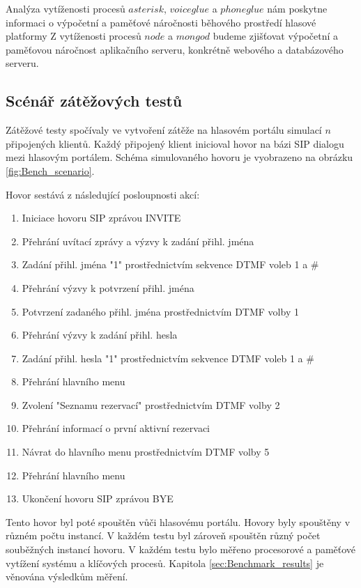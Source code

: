 \documentclass[ing,male,java,dept460]{diploma}						%
\begin{document}
Analýza vytíženosti procesů $asterisk$, $voiceglue$ a $phoneglue$ nám poskytne informaci o výpočetní a paměťové náročnosti běhového prostředí hlasové platformy Z vytíženosti procesů $node$ a $mongod$ budeme zjišťovat výpočetní a paměťovou náročnost aplikačního serveru, konkrétně webového a databázového serveru.

\subsection{Scénář zátěžových testů}
Zátěžové testy spočívaly ve vytvoření zátěže na hlasovém portálu simulací $n$ připojených klientů. Každý připojený klient inicioval hovor na bázi SIP dialogu mezi hlasovým portálem. Schéma simulovaného hovoru je vyobrazeno na obrázku \ref{fig:Bench_scenario}.

Hovor sestává z následující posloupnosti akcí:

\begin{enumerate}
\item Iniciace hovoru SIP zprávou INVITE
\item Přehrání uvítací zprávy a výzvy k zadání přihl. jména
\item Zadání přihl. jména "1" prostřednictvím sekvence DTMF voleb 1 a \#
\item Přehrání výzvy k potvrzení přihl. jména
\item Potvrzení zadaného přihl. jména prostřednictvím DTMF volby 1
\item Přehrání výzvy k zadání přihl. hesla
\item Zadání přihl. hesla "1" prostřednictvím sekvence DTMF voleb 1 a \#
\item Přehrání hlavního menu
\item Zvolení "Seznamu rezervací" prostřednictvím DTMF volby 2
\item Přehrání informací o první aktivní rezervaci
\item Návrat do hlavního menu prostřednictvím DTMF volby 5
\item Přehrání hlavního menu
\item Ukončení hovoru SIP zprávou BYE
\end{enumerate}

Tento hovor byl poté spouštěn vůči hlasovému portálu. Hovory byly spouštěny v různém počtu instancí. V každém testu byl zároveň spouštěn různý počet souběžných instancí hovoru. V každém testu bylo měřeno procesorové a paměťové vytížení systému a klíčových procesů. Kapitola \ref{sec:Benchmark_results} je věnována výsledkům měření.
\end{document}
